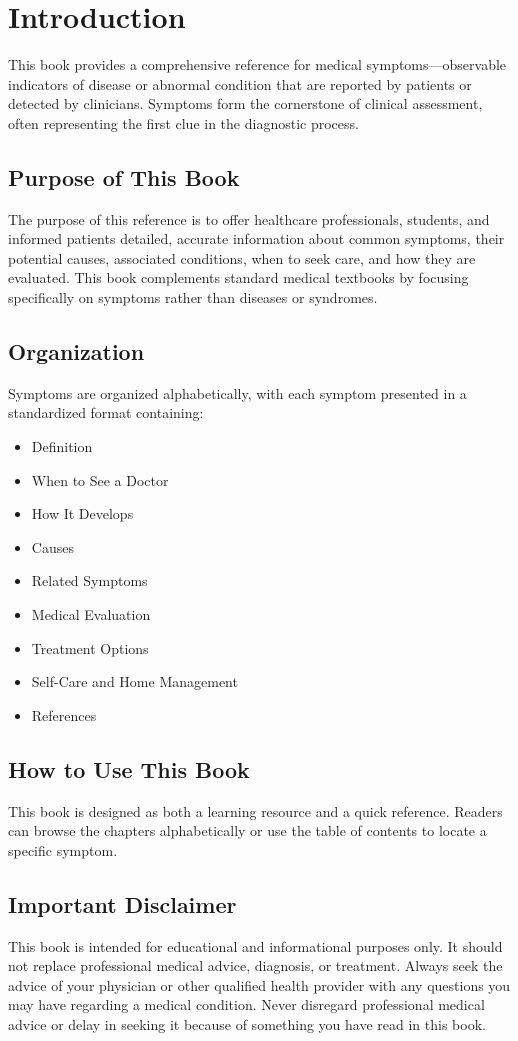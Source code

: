 \chapter{Introduction}

This book provides a comprehensive reference for medical symptoms---observable indicators of disease or abnormal condition that are reported by patients or detected by clinicians. Symptoms form the cornerstone of clinical assessment, often representing the first clue in the diagnostic process.

\section*{Purpose of This Book}
The purpose of this reference is to offer healthcare professionals, students, and informed patients detailed, accurate information about common symptoms, their potential causes, associated conditions, when to seek care, and how they are evaluated. This book complements standard medical textbooks by focusing specifically on symptoms rather than diseases or syndromes.

\section*{Organization}
Symptoms are organized alphabetically, with each symptom presented in a standardized format containing:
\begin{itemize}
  \item Definition
  \item When to See a Doctor
  \item How It Develops
  \item Causes
  \item Related Symptoms
  \item Medical Evaluation
  \item Treatment Options
  \item Self-Care and Home Management
  \item References
\end{itemize}

\section*{How to Use This Book}
This book is designed as both a learning resource and a quick reference. Readers can browse the chapters alphabetically or use the table of contents to locate a specific symptom.

\section*{Important Disclaimer}
This book is intended for educational and informational purposes only. It should not replace professional medical advice, diagnosis, or treatment. Always seek the advice of your physician or other qualified health provider with any questions you may have regarding a medical condition. Never disregard professional medical advice or delay in seeking it because of something you have read in this book.

